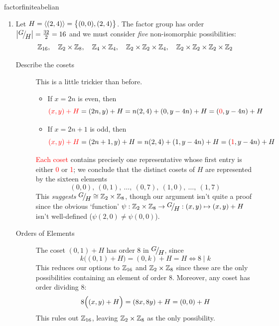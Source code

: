 \begin{examples}{}{factorfiniteabelian}
\begin{enumerate}
	
		\item\label{ex:factoriso3} Let $H=\left\langle (2,4)\right\rangle=\bigl\{(0,0),(2,4)\bigr\}$. The factor group has order $\nm{\quotient GH}=\frac{32}2=16$ and we must consider \emph{five} non-isomorphic possibilities:\footnotemark{}
		\[
			\mathbb{Z}_{16},\quad \mathbb{Z}_2\times\mathbb{Z}_8,\quad \mathbb{Z}_4\times\mathbb{Z}_4,\quad \mathbb{Z}_2\times\mathbb{Z}_2\times\mathbb{Z}_4,\quad \mathbb{Z}_2\times\mathbb{Z}_2\times\mathbb{Z}_2\times\mathbb{Z}_2
		\]
	  \begin{description}
		  \item[Describe the cosets] This is a little trickier than before.
		  \begin{itemize}
	  		\item If $x=2n$ is even, then
	  		\[
	  			\textcolor{red}{(x,y)+H}
	  			=(2n,y)+H
	  			=n(2,4)+(0,y-4n)+H
	  			=(\textcolor{red}{0},y-4n)+H
	  		\]
	  		\item If $x=2n+1$ is odd, then
	  		\[
	  			\textcolor{red}{(x,y)+H}
	  			=(2n+1,y)+H
	  			=n(2,4)+(1,y-4n)+H
	  			=(\textcolor{red}{1},y-4n)+H
	  		\]
	  	\end{itemize}
	 		\textcolor{red}{Each coset} contains precisely one representative whose first entry is either \textcolor{red}{0} or \textcolor{red}{1}; we conclude that the distinct cosets of $H$ are represented by the sixteen elements
			\[
				(0,0),\ (0,1),\ \ldots,\ (0,7),\ (1,0),\ \ldots,\ (1,7) \tag{$(x,y)$ where $x\in\Z_2$, $y\in\Z_8$}
			\]
			This \emph{suggests} $\quotient GH\cong\Z_2\times\Z_8$, though our argument isn't quite a proof since the obvious `function' $\psi:\Z_2\times\Z_8\to\quotient GH:(x,y)\mapsto(x,y)+H$ isn't well-defined ($\psi(2,0)\neq\psi(0,0)$).
		  
			\item[Orders of Elements] The coset $(0,1)+H$ has order 8 in $\quotient GH$, since
			\[
				k\bigl((0,1)+H\bigr)=(0,k)+H=H\iff 8\mid k
			\]
			This reduces our options to $\mathbb{Z}_{16}$ and $\mathbb{Z}_2\times\mathbb{Z}_8$ since these are the only possibilities containing an element of order 8. Moreover, any coset has order dividing 8:
			\[
				8\Bigl((x,y)+H\Bigr)
				=(8x,8y)+H
				=(0,0)+H
			\]
	  	This rules out $\mathbb{Z}_{16}$, leaving $\mathbb{Z}_2\times\mathbb{Z}_8$ as the only possibility.
		\end{description}
	\end{enumerate}
\end{examples}


		

